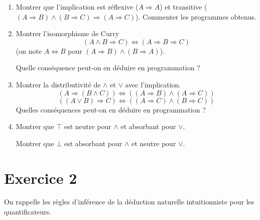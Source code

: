 \documentclass{article}
\begin{document}
\begin{enumerate}
\item Montrer que l'implication est réflexive (\(A \Rightarrow A\))
  et transitive (\((A \Rightarrow B) \wedge (B \Rightarrow C) \Rightarrow (A \Rightarrow C)\)).
  Commenter les programmes obtenus.
\item Montrer l'isomorphisme de Curry
  \[(A \wedge B \Rightarrow C) \Leftrightarrow (A \Rightarrow B \Rightarrow C)\]
  (on note \(A \Leftrightarrow B\) pour \((A \Rightarrow B) \wedge (B \Rightarrow A)\)).

  Quelle conséquence peut-on en déduire en programmation ?
\item Montrer la distributivité de \(\wedge\) et \(\vee\) avec l'implication.
  \[(A \Rightarrow (B \wedge C)) \Leftrightarrow ((A \Rightarrow B) \wedge (A \Rightarrow C))\]
  \[((A \vee B) \Rightarrow C) \Leftrightarrow ((A \Rightarrow C) \wedge (B \Rightarrow C))\]
  Quelles conséquences peut-on en déduire en programmation ?
\item Montrer que \(\top\) est neutre pour \(\wedge\) et absorbant pour \(\vee\).

  Montrer que \(\bot\) est absorbant pour \(\wedge\) et neutre pour \(\vee\).
\end{enumerate}

\section*{Exercice 2}

On rappelle les règles d'inférence de la déduction naturelle intuitionniste pour les quantificateurs.
\end{document}
